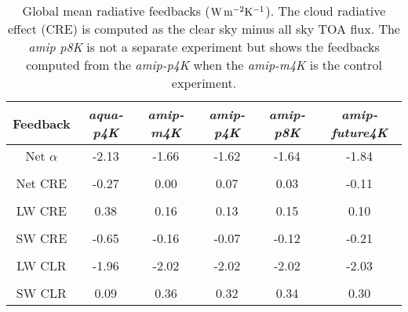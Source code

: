 \documentclass[draft]{agujournal2019}
\begin{document}
\begin{table}
\begin{center}
\caption{Global mean radiative feedbacks ($\rm{W\, m^{-2} K^{-1}}$).  The cloud radiative effect (CRE) is computed as
 the clear sky minus all sky TOA flux.   The \textit{amip p8K} is not a separate experiment but
shows the feedbacks computed from the \textit{amip-p4K} when the \textit{amip-m4K} is the control experiment.}
    \begin{tabular}{*{6}{c}}
    \hline
    \hline
 Feedback & \textit{aqua-p4K} & \textit{amip-m4K} & \textit{amip-p4K} &  \textit{amip-p8K} & \textit{amip-future4K}   \\ \hline
    Net  $\alpha$        &   -2.13      &  -1.66          &  -1.62         & -1.64           & -1.84           \\ 
    \\
    Net CRE   & -0.27       &  0.00              & 0.07         & 0.03         & -0.11            \\  
    \\
    LW CRE   & 0.38        &  0.16              & 0.13           & 0.15        & 0.10             \\  
    \\
    SW CRE  & -0.65     &  -0.16              & -0.07          & -0.12        & -0.21            \\  
    \\
    LW CLR   & -1.96       &  -2.02            & -2.02           & -2.02       & -2.03            \\  
    \\
    SW CLR  & 0.09        & 0.36              & 0.32             & 0.34        & 0.30             \\  \hline

    \end{tabular}\par
    \label{tab:lambda_AGCM}
\end{center}
\end{table}
\end{document}
